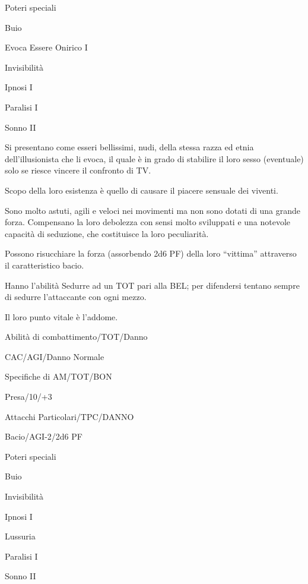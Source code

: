 
\begin{parmostro}{Poteri speciali}
\item Buio
\item Evoca Essere Onirico I
\item Invisibilit\`a
\item Ipnosi I
\item Paralisi I
\item Sonno II
\end{parmostro}


Si presentano come esseri bellissimi, nudi, della stessa razza ed
etnia dell'illusionista che li evoca, il quale \`e in grado di
stabilire il loro sesso (eventuale) solo se riesce vincere il
confronto di TV. 

Scopo della loro esistenza \`e quello di causare il piacere sensuale
dei viventi.

Sono molto astuti, agili e veloci nei movimenti ma non sono dotati di
una grande forza. Compensano la loro debolezza con sensi molto
sviluppati e una notevole capacit\`a di seduzione, che costituisce la
loro peculiarit\`a.

Possono risucchiare la forza (assorbendo 2d6 PF) della loro
``vittima'' attraverso il caratteristico bacio.

Hanno l'abilit\`a Sedurre ad un TOT pari alla BEL; per difendersi
tentano sempre di sedurre l'attaccante con ogni mezzo. 

Il loro punto vitale \`e l'addome.


\begin{parmostro}{Abilit\`a di combattimento/TOT/Danno}
\item CAC/AGI/Danno Normale
\end{parmostro}

\begin{parmostro}{Specifiche di AM/TOT/BON}
\item Presa/10/+3
\end{parmostro}

\begin{parmostro}{Attacchi Particolari/TPC/DANNO}
\item Bacio/AGI-2/2d6 PF
\end{parmostro}

\begin{parmostro}{Poteri speciali}
\item Buio
\item Invisibilit\`a
\item Ipnosi I
\item Lussuria
\item Paralisi I
\item Sonno II
\end{parmostro}


